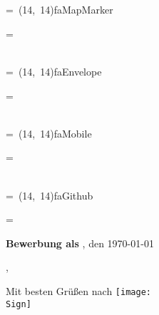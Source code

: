 \documentclass[10pt,A4]{article}
\newcommand*{\vcenteredhbox}[1]{\begingroup
\setbox0=\hbox{#1}\parbox{\wd0}{\box0}\endgroup}
\newcommand{\icon}[2]{
	\makebox(#2, #2){\textcolor{textcolor}{\csname fa#1\endcsname}}}	%
\newcommand{\icontext}[3]{ 						%
	\vcenteredhbox{\icon{#1}{#2}} \vcenteredhbox{\textcolor{textcolor}{#3}}
}
\newcommand*{\contactpage}[1]{
	\begin{minipage}{0.25\textwidth}
		\icontext{MapMarker}{#1}{\Location}\\
		\icontext{Envelope}{#1}{\Mail}\\
		\icontext{Mobile}{#1}{\Phone}\\
		\icontext{Github}{#1}{\Link}
	\end{minipage}
}
\newcounter{a}
\newcounter{b}
\newcounter{c}
\begin{document}
\begin{minipage}[c][2.25cm][c]{0.55\textwidth}
	\vspace{0pt}
	\Huge
	\textcolor{textcolor}{\textbf{\Name}}

	\Large
	\textcolor{color1}{~\Role}
	\vspace{\fill}

	\footnotesize
	\textcolor{color2}{~~~}
\end{minipage}
\hfill
\contactpage{14}
\hspace*{-0.5cm}
\vfill
\begin{minipage}[b]{1\textwidth}

\large
	\textcolor{textcolor}{\textbf{\CompanyName}}

	\textcolor{textcolor}{\Address}

	\textcolor{textcolor}{\City}
	\newline
	\newline
	\newline
	\newline

	\textcolor{textcolor}{\Large{\textbf{Bewerbung als \NewRole}}}
	\hspace*{\fill}
	\textcolor{textcolor}{\Location, den \today}

\end{minipage}
\vfill
\begin{minipage}[t][19cm][t]{0.95\textwidth}
\begin{flushleft}
\textcolor{textcolor}{\Recruiter,}
\newline
\newline

\textcolor{textcolor}{\Letter
\newline
\newline
\newline
\newline
Mit besten Grüßen nach \City
\newline
\newline
\texttt{[image: \\Sign]}
\newline
\Name
\newline
\newline
\newline
\newline
\textcolor{textcolor}{\Postskriptum}
}
\end{flushleft}
\end{minipage}
\end{document}
